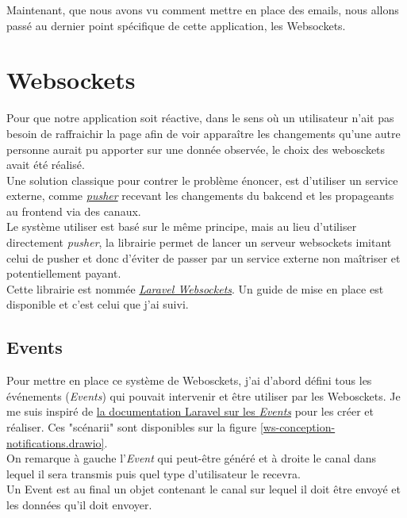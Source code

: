 \documentclass[
    iai, %
    il, %
]{heig-tb}
\begin{document}
Maintenant, que nous avons vu comment mettre en place des emails, nous allons passé au dernier point spécifique de cette application, les Websockets.

\section{Websockets}
Pour que notre application soit réactive, dans le sens où un utilisateur n'ait pas besoin de raffraichir la page afin de voir apparaître les changements qu'une autre personne aurait pu apporter sur une donnée observée, le choix des webosckets avait été réalisé. \\
Une solution classique pour contrer le problème énoncer, est d'utiliser un service externe, comme \href{https://pusher.com/}{\emph{pusher}} recevant les changements du bakcend et les propageants au frontend via des canaux. \\
Le système utiliser est basé sur le même principe, mais au lieu d'utiliser directement \emph{pusher}, la librairie permet de lancer un serveur websockets imitant celui de pusher et donc d'éviter de passer par un service externe non maîtriser et potentiellement payant. \\
Cette librairie est nommée \href{https://beyondco.de/docs/laravel-websockets/getting-started/introduction}{\emph{Laravel Websockets}}. Un guide de mise en place est disponible et c'est celui que j'ai suivi.

\subsection{Events}

Pour mettre en place ce système de Webosckets, j'ai d'abord défini tous les événements (\emph{Events}) qui pouvait intervenir et être utiliser par les Webosckets. Je me suis inspiré de \href{https://laravel.com/docs/9.x/events}{la documentation Laravel sur les \emph{Events}} pour les créer et réaliser.
Ces "scénarii" sont disponibles sur la figure \ref{ws-conception-notifications.drawio}. \\
On remarque à gauche l'\emph{Event} qui peut-être généré et à droite le canal dans lequel il sera transmis puis quel type d'utilisateur le recevra. \\
Un Event est au final un objet contenant le canal sur lequel il doit être envoyé et les données qu'il doit envoyer.
\end{document}
